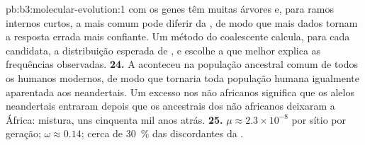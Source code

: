 \begin{solution}{pb:b3:molecular-evolution:1}
com  os genes têm muitas árvores e, para
ramos internos curtos, a  mais comum pode diferir da , de modo que mais dados tornam a resposta errada mais
confiante. Um método do coalescente calcula, para cada 
candidata, a distribuição esperada de , e escolhe a  que melhor explica as frequências observadas.
\textbf{24.} A  aconteceu na população
ancestral comum de todos os humanos modernos, de modo que tornaria toda
população humana igualmente aparentada aos neandertais. Um excesso nos
não africanos significa que os alelos neandertais entraram depois que os
ancestrais dos não africanos deixaram a África: mistura, uns cinquenta mil
anos atrás.
\textbf{25.} $\mu \approx 2.3\times 10^{-8}$ por sítio por geração;
$\omega \approx 0.14$; cerca de \qty{30}{\%} das 
discordantes da .
\end{solution}
